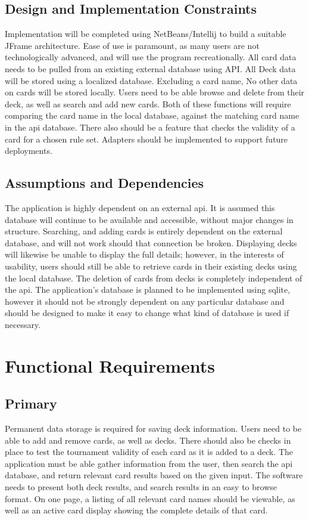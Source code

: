 \documentclass[12pt]{report}
\begin{document}
\section{Design and Implementation Constraints}
Implementation will be completed using NetBeans/Intellij to build a suitable JFrame architecture. Ease of use is paramount, as many users are not technologically advanced, and will use the program recreationally. All card data needs to be pulled from an existing external database using API. All Deck data will be stored using a localized database. Excluding a card name, No other data on cards will be stored locally. Users need to be able browse and delete from their deck, as well as search and add new cards. Both of these functions will require comparing the card name in the local database, against the matching card name in the \acrshort{api} database. There also should be a feature that checks the validity of a card for a chosen rule set.  Adapters should be implemented to support future deployments.
\section{Assumptions and Dependencies}
The application is highly dependent on an external \acrshort{api}. It is assumed this database will continue to be available and accessible, without major changes in structure. Searching, and adding cards is entirely dependent on the external database, and will not work should that connection be broken. Displaying decks will likewise be unable to display the full details; however, in the interests of usability, users should still be able to retrieve cards in their existing decks using the local database. The deletion of cards from decks is completely independent of the \acrshort{api}. The application's database is planned to be implemented using \gls{sqlite}, however it should not be strongly dependent on any particular database and should be designed to make it easy to change what kind of database is used if necessary.
\chapter{Functional Requirements}
\section{Primary}
Permanent data storage is required for saving deck information. Users need to be able to add and remove cards, as well as decks. There should also be checks in place to test the tournament validity of each card as it is added to a deck. The application must be able gather information from the user, then search the \acrshort{api} database, and return relevant card results based on the given input. The software needs to present both deck results, and search results in an easy to browse format. On one page, a listing of all relevant card names should be viewable, as well as an active card display showing the complete details of that card.
\end{document}
